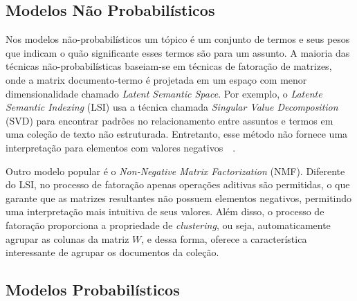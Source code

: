 
\subsection{Modelos Não Probabilísticos}

Nos modelos não-probabilísticos um tópico é um conjunto de termos e seus pesos que indicam o quão significante esses termos são para um assunto. A maioria das técnicas não-probabilísticas baseiam-se em técnicas de fatoração de matrizes, onde a matrix documento-termo é projetada em um espaço com menor dimensionalidade chamado \textit{Latent Semantic Space}. Por exemplo, o \textit{Latente Semantic Indexing} (LSI) usa a técnica chamada \textit{Singular Value Decomposition} (SVD) para encontrar padrões no relacionamento entre assuntos e termos em uma coleção de texto não estruturada. Entretanto, esse método não fornece uma interpretação para elementos com valores negativos~\cite{Deerwester1990}~\cite{Cheng2013}. %

Outro modelo popular é o \textit{Non-Negative Matrix Factorization} (NMF).  Diferente do LSI, no processo de fatoração apenas operações aditivas são permitidas, o que garante que as matrizes resultantes não possuem elementos negativos, permitindo uma interpretação mais intuitiva de seus valores. Além disso, o processo de fatoração proporciona a propriedade de \textit{clustering}, ou seja, automaticamente agrupar as colunas da matriz $W$, e dessa forma, oferece a característica interessante de agrupar os documentos da coleção. 



\subsection{Modelos Probabilísticos}

